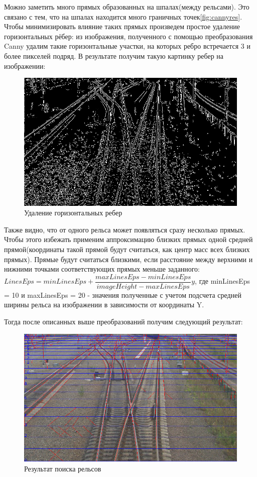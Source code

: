 \newpage
Можно заметить много прямых образованных на шпалах(между рельсами). Это связано с тем, что на шпалах находится много граничных точек\ref{fig:cannyres}. 
Чтобы минимизировать влияние таких прямых произведем простое удаление горизонтальных рёбер: из изображения, полученного с помощью преобразования Canny удалим такие горизонтальные участки, на которых ребро встречается 3 и более пикселей подряд.
В результате получим такую картинку ребер на изображении:
\begin{figure}[!h]
	\centering
	\includegraphics[width=0.9\linewidth]{pictures/screenshot0014}
	\caption{Удаление горизонтальных ребер}
	\label{fig:canny_remove_horizontal}
\end{figure}

Также видно, что от одного рельса может появляться сразу несколько прямых. Чтобы этого избежать применим аппроксимацию близких прямых одной средней прямой(координаты такой прямой будут считаться, как центр масс всех близких прямых). 
Прямые будут считаться близкими, если расстояние между верхними и нижними точками соответствующих прямых меньше заданного: \newline
$LinesEps = minLinesEps + \dfrac{maxLinesEps - minLinesEps}{imageHeight - maxLinesEps}y$, \newline 
где minLinesEps = 10 и maxLinesEps = 20 - значения полученные с учетом подсчета средней ширины рельса на изображении в зависимости от координаты Y.

Тогда после описанных выше преобразований получим следующий результат:
\begin{figure}[!h]
	\centering
	\includegraphics[width=0.9\linewidth]{pictures/screenshot0013}
	\caption{Результат поиска рельсов}
	\label{fig:screenshot0013}
\end{figure}

